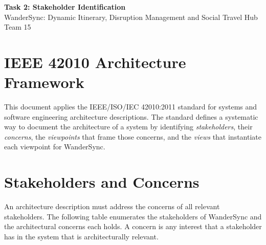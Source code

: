 \documentclass[12pt,a4paper]{article}
\begin{document}
\begin{center}
  {\LARGE\bfseries Task 2: Stakeholder Identification}\\[0.4em]
  {\large WanderSync: Dynamic Itinerary, Disruption Management and Social Travel Hub}\\[0.2em]
  {\normalsize Team 15}
\end{center}

\vspace{1em}

\section{IEEE 42010 Architecture Framework}

This document applies the IEEE/ISO/IEC 42010:2011 standard for systems and software engineering
architecture descriptions. The standard defines a systematic way to document the architecture of a
system by identifying \textit{stakeholders}, their \textit{concerns}, the \textit{viewpoints} that
frame those concerns, and the \textit{views} that instantiate each viewpoint for WanderSync.

\section{Stakeholders and Concerns}

An architecture description must address the concerns of all relevant stakeholders. The following
table enumerates the stakeholders of WanderSync and the architectural concerns each holds. A concern
is any interest that a stakeholder has in the system that is architecturally relevant.
\end{document}
